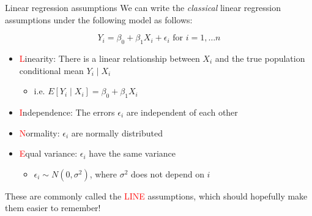 \documentclass[10pt,t]{beamer}
\begin{document}
\begin{frame}{Linear regression assumptions}
We can write the \textit{classical} linear regression assumptions under the following model as follows:

$$
Y_i = \beta_0 + \beta_1 X_i + \epsilon_i \text{ for } i = 1, \dots n
$$

\begin{itemize}
	\item \textcolor{red}{L}inearity: There is a linear relationship between $X_i$ and the true population conditional mean $Y_i \mid X_i$
	\begin{itemize}
		\item i.e. $E[Y_i \mid X_i] = \beta_0 + \beta_1 X_i$
	\end{itemize}
	\item \textcolor{red}{I}ndependence: The errors $\epsilon_i$ are independent of each other
	\item \textcolor{red}{N}ormality: $\epsilon_i$ are normally distributed
	\item \textcolor{red}{E}qual variance: $\epsilon_i$ have the same variance
	\begin{itemize}
		\item $\epsilon_i \sim N(0, \sigma^2)$, where $\sigma^2$ does not depend on $i$
	\end{itemize}
\end{itemize}

\vspace{0.3cm}

These are commonly called the \textcolor{red}{LINE} assumptions, which should hopefully make them easier to remember!
\end{frame}
\end{document}
